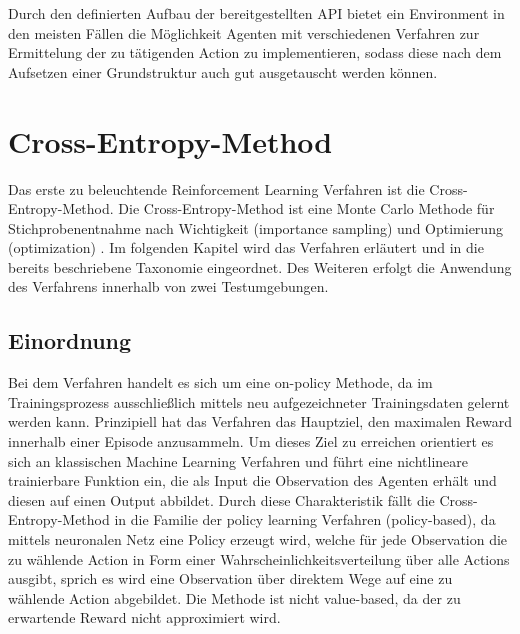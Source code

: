 \documentclass[11pt]{scrartcl}
\begin{document}
\noindent
Durch den definierten Aufbau der bereitgestellten API bietet ein Environment in den meisten Fällen
die Möglichkeit Agenten mit verschiedenen Verfahren zur Ermittelung der zu tätigenden Action zu
implementieren, sodass diese nach dem Aufsetzen einer Grundstruktur auch gut ausgetauscht werden
können.


\newpage
\section{Cross-Entropy-Method}
\label{sec:cross-entropy-method}
Das erste zu beleuchtende Reinforcement Learning Verfahren ist die Cross-Entropy-Method. Die
Cross-Entropy-Method ist eine Monte Carlo Methode für Stichprobenentnahme nach Wichtigkeit
(importance sampling) und Optimierung (optimization) \cite[~S.29 ff.]{R2004}. Im folgenden
Kapitel wird das Verfahren erläutert und in die bereits beschriebene Taxonomie eingeordnet.
Des Weiteren erfolgt die Anwendung des Verfahrens innerhalb von zwei Testumgebungen. 

\subsection{Einordnung}
Bei dem Verfahren handelt es sich um eine on-policy Methode, da im Trainingsprozess ausschließlich
mittels neu aufgezeichneter Trainingsdaten gelernt werden kann. Prinzipiell hat das Verfahren das
Hauptziel, den maximalen Reward innerhalb einer Episode anzusammeln. Um dieses Ziel zu erreichen
orientiert es sich an klassischen Machine Learning Verfahren und führt eine nichtlineare trainierbare
Funktion ein, die als Input die Observation des Agenten erhält und diesen auf einen Output abbildet.
Durch diese Charakteristik fällt die Cross-Entropy-Method in die Familie der policy learning Verfahren
(policy-based), da mittels neuronalen Netz eine Policy erzeugt wird, welche für jede Observation die
zu wählende Action in Form einer Wahrscheinlichkeitsverteilung über alle Actions ausgibt, sprich es
wird eine Observation über direktem Wege auf eine zu wählende Action abgebildet. Die
Methode ist nicht value-based, da der zu erwartende Reward nicht approximiert wird.
\end{document}
